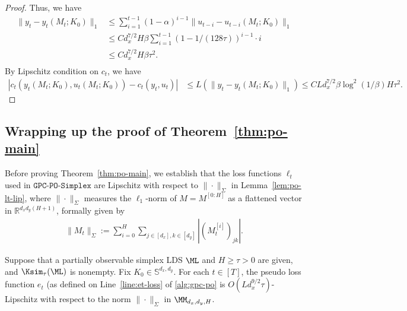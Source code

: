 \begin{proof}
Thus, we have
\begin{align*}
\|y_t-y_t(M_t;K_0)\|_1&\le \sum_{i=1}^{t-1}(1-\alpha)^{i-1}\|u_{t-i}-u_{t-i}(M_t;K_0)\|_1\\
&\le Cd_x^{7/2}H\beta\sum_{i=1}^{t-1}(1-1/(128\tau))^{i-1}\cdot i\\
&\le Cd_x^{7/2}H\beta \tau^2.\\
\end{align*}
By Lipschitz condition on $c_t$, we have
\begin{align*}
|c_t(y_t(M_t;K_0),u_t(M_t;K_0))-c_t(y_t,u_t)|&\le L(\|y_t-y_t(M_t;K_0)\|_1)\le C L d_x^{7/2} \beta\log^2(1/\beta)H\tau^2.
\end{align*}
\end{proof}

\subsection{Wrapping up the proof of Theorem~\ref{thm:po-main}}\label{sec:po-proof}

Before proving Theorem~\ref{thm:po-main}, we establish that the loss functions $\ell_t$ used in $\texttt{GPC-PO-Simplex}$ are Lipschitz with respect to $\|\cdot\|_{\Sigma}$ in Lemma~\ref{lem:po-lt-lip}, where  $\|\cdot\|_{\Sigma}$ measures the $\ell_1$-norm of $M=M^{[0:H]}$ as a flattened vector in $\mathbb{R}^{d_xd_y(H+1)}$, formally given by
\begin{align*}
\|M_t\|_{\Sigma}:=\sum_{i=0}^{H}\sum_{j\in[d_x],k\in[d_y]}|(M_t^{[i]})_{jk}|.
\end{align*}

\begin{lemma} [Lipschitzness of $e_t$]
\label{lem:po-lt-lip}
Suppose that a partially observable simplex LDS $\ML$ and $H\ge \tau>0$ are given, and $\Ksim_{\tau}(\ML)$ is nonempty. Fix $K_0\in\mathbb{S}^{d_x,d_y}$. For each $t\in[T]$, the pseudo loss function $e_t$ (as defined on Line~\ref{line:et-loss} of \cref{alg:gpc-po} is $O(Ld_x^{9/2}\tau)$-Lipschitz with respect to the norm $\|\cdot\|_{\Sigma}$ in $\MM_{d_x,d_y,H}$.  %
\end{lemma}

